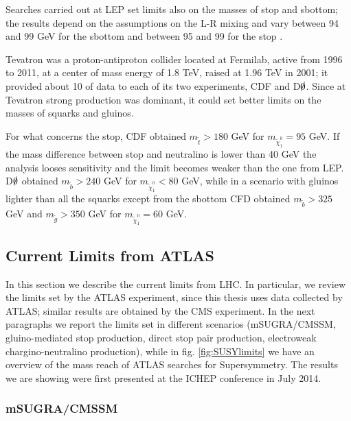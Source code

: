 Searches carried out at LEP set limits also on the masses of stop and sbottom; the results depend on the assumptions on the L-R mixing and vary between 94 and 99 GeV for the sbottom and between 95 and 99 for the stop \cite{LEPWG:3rdgen}.

Tevatron was a proton-antiproton collider located at Fermilab, active from 1996 to 2011, at a center of mass energy of 1.8 TeV, raised at 1.96 TeV in 2001; it provided about 10 \ifb of data to each of its two experiments, CDF and D$\slashed{0}$. Since at Tevatron strong production was dominant, it could set better limits on the masses of squarks and gluinos.
 
For what concerns the stop, CDF obtained $m_{\tilde{t}} > 180$ GeV for $m_{\tilde{\chi}_1^0} = 95$ GeV. If the mass difference between stop and neutralino is lower than 40 GeV the analysis looses sensitivity and the limit becomes weaker than the one from LEP. D$\slashed{0}$ obtained  $m_{\tilde{b}} > 240$ GeV for $m_{\tilde{\chi}_1^0} < 80$ GeV, while in a scenario with gluinos lighter than all the squarks except from the sbottom CFD obtained $m_{\tilde{b}} > 325$ GeV and $m_{\tilde{g}} > 350$ GeV for $m_{\tilde{\chi}_1^0} = 60$ GeV.




\subsection{Current Limits from ATLAS}
\label{sec:ATLASlimits}

In this section we describe the current limits from LHC. In particular, we review the limits set by the ATLAS experiment, since this thesis uses data collected by ATLAS; similar results are obtained by the CMS experiment. In the next paragraphs we report the limits set in different scenarios (mSUGRA/CMSSM, gluino-mediated stop production, direct stop pair production, electroweak chargino-neutralino production), while in fig. \ref{fig:SUSYlimits} we have an overview of the mass reach of ATLAS searches for Supersymmetry. The results we are showing were first presented at the ICHEP conference in July 2014.


\subsubsection{mSUGRA/CMSSM}


